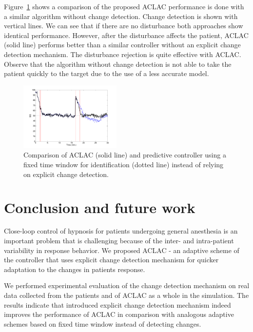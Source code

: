 Figure~\ref{fig:fig1Comparison} shows a comparison of the proposed
ACLAC performance is done with a similar algorithm without change
detection. Change detection is shown with vertical lines. We can see
that if there are no disturbance both approaches show identical
performance. However, after the disturbance affects the patient, ACLAC
(solid line) performs better than a similar controller without an
explicit change detection mechanism. The disturbance rejection is
quite effective with ACLAC. Observe that the algorithm without change
detection is not able to take the patient quickly to the target due to
the use of a less accurate model.

\begin{figure}[htb!]
\includegraphics[width=0.45\textwidth]{./pics/aclac_paper/fig1Comparison.pdf}%
\caption{Comparison of ACLAC (solid line) and predictive controller
  using a fixed time window for identification (dotted line) instead
  of relying on explicit change detection.}
\label{fig:fig1Comparison}
\end{figure}

\section{Conclusion and future work}
Close-loop control of hypnosis for patients undergoing general
anesthesia is an important problem that is challenging because of the
inter- and intra-patient variability in response behavior.  We
proposed ACLAC - an adaptive scheme of the controller that uses
explicit change detection mechanism for quicker adaptation to the
changes in patients response.

We performed experimental evaluation of the change detection mechanism
on real data collected from the patients and of ACLAC as a whole in
the simulation.  The results indicate that introduced explicit change
detection mechanism indeed improves the performance of ACLAC in
comparison with analogous adaptive schemes based on fixed time window
instead of detecting changes.

